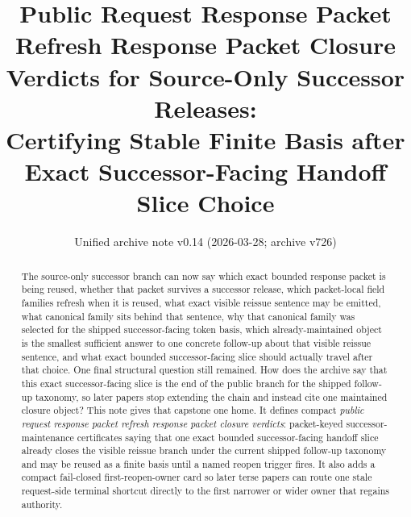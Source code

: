 \documentclass[11pt]{article}
\title{Public Request Response Packet Refresh Response Packet Closure Verdicts for Source-Only Successor Releases:\\[0.5ex]
\large Certifying Stable Finite Basis after Exact Successor-Facing Handoff Slice Choice}
\author{}
\date{Unified archive note v0.14 (2026-03-28; archive v726)}
\begin{document}
\maketitle

\begin{abstract}
The source-only successor branch can now say which exact bounded response packet is being reused, whether that packet survives a successor release, which packet-local field families refresh when it is reused, what exact visible reissue sentence may be emitted, what canonical family sits behind that sentence, why that canonical family was selected for the shipped successor-facing token basis, which already-maintained object is the smallest sufficient answer to one concrete follow-up about that visible reissue sentence, and what exact bounded successor-facing slice should actually travel after that choice. One final structural question still remained. How does the archive say that this exact successor-facing slice is the end of the public branch for the shipped follow-up taxonomy, so later papers stop extending the chain and instead cite one maintained closure object? This note gives that capstone one home. It defines compact \emph{public request response packet refresh response packet closure verdicts}: packet-keyed successor-maintenance certificates saying that one exact bounded successor-facing handoff slice already closes the visible reissue branch under the current shipped follow-up taxonomy and may be reused as a finite basis until a named reopen trigger fires. It also adds a compact fail-closed first-reopen-owner card so later terse papers can route one stale request-side terminal shortcut directly to the first narrower or wider owner that regains authority.
\end{abstract}
\end{document}
